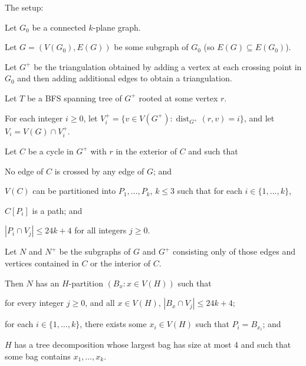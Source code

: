 \documentclass{patmorin}
\DeclareMathOperator{\dist}{dist}
\begin{document}
\begin{lem} The setup:
  \begin{compactenum}
    \item Let $G_0$ be a connected $k$-plane graph.
    \item Let $G=(V(G_0), E(G))$ be some subgraph of $G_0$ (so $E(G)\subseteq E(G_0)$).
    \item Let $G^+$ be the triangulation obtained by adding a vertex at each crossing point in $G_0$ and then adding additional edges to obtain a triangulation.
    \item Let $T$ be a BFS spanning tree of $G^+$ rooted at some vertex $r$.
    \item For each integer $i\ge 0$, let $V^+_i=\{v\in V(G^+):\dist_{G^+}(r,v)=i\}$, and let $V_i=V(G)\cap V^+_i$.
    \item Let $C$ be a cycle in $G^+$ with $r$ in the exterior of $C$ and such that
    \begin{compactenum} 
      \item No edge of $C$ is crossed by any edge of $G$; and
      \item $V(C)$ can be partitioned into $P_1,\ldots,P_k$, $k\le 3$ such that for each $i\in\{1,\ldots,k\}$,
      \begin{compactenum}
        \item $C[P_i]$ is a path; and
        \item $|P_i\cap V_j| \le 24k+4$ for all integers $j\ge 0$.
      \end{compactenum}
    \end{compactenum}
    \item Let $N$ and $N^+$ be the subgraphs of $G$ and $G^+$ consisting only of those edges and vertices contained in $C$ or the interior of $C$.
  \end{compactenum}
  Then $N$ has an $H$-partition $(B_x : x\in V(H))$ such that
  \begin{compactenum}
    \item for every integer $j\ge 0$, and all $x\in V(H)$, $|B_x\cap V_j|\le 24k+4$; 
    \item for each $i\in\{1,\ldots,k\}$, there exists some $x_i\in V(H)$ such that $P_i=B_{x_i}$; and
    \item $H$ has a tree decomposition whose largest bag has size at most 4 and such that some bag contains $x_1,\ldots,x_k$.
  \end{compactenum}
\end{lem}
\end{document}
